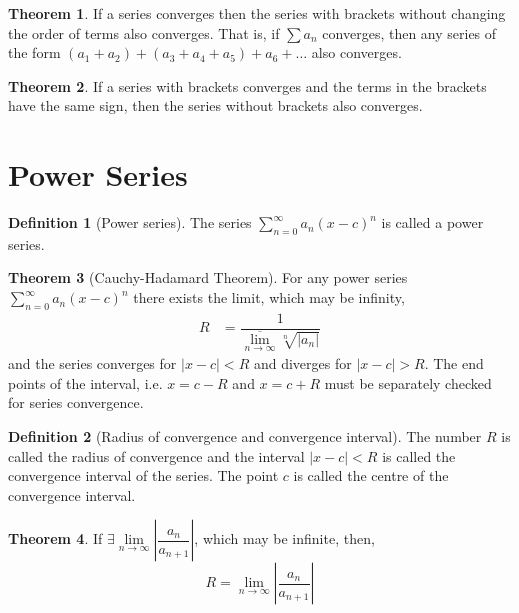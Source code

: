 \documentclass[fleqn, a4paper, 12pt, twoside]{article}
\theoremstyle{definition}
\newtheorem{definition}{Definition}
\theoremstyle{theorem}
\newtheorem{theorem}{Theorem}
\begin{document}
{\begin{theorem}
	If a series converges then the series with brackets without changing the order of terms also converges.
	That is, if $\sum a_n$ converges, then any series of the form $(a_1 + a_2) + (a_3 + a_4 + a_5) + a_6 + \dots$ also converges.
\end{theorem}

\begin{theorem}
	If a series with brackets converges and the terms in the brackets have the same sign, then the series without brackets also converges.
\end{theorem}

\section{Power Series}

\begin{definition}[Power series]
	The series $\sum\limits_{n = 0}^{\infty} a_n (x - c)^n$ is called a power series.
\end{definition}

\begin{theorem}[Cauchy-Hadamard Theorem]
	For any power series $\sum\limits_{n = 0}^{\infty} a_n (x - c)^n$ there exists the limit, which may be infinity,
	\begin{align*}
		R &= \dfrac{1}{\overline{\lim\limits_{n \to \infty}} \sqrt[n]{|a_n|}}
	\end{align*}
	and the series converges for $|x - c| < R$ and diverges for $|x - c| > R$.
	The end points of the interval, i.e. $x = c - R$ and $x = c + R$ must be separately checked for series convergence.
\end{theorem}

\begin{definition}[Radius of convergence and convergence interval]
	The number $R$ is called the radius of convergence and the interval $|x - c| < R$ is called the convergence interval of the series.
	The point $c$ is called the centre of the convergence interval.
\end{definition}

\begin{theorem}
	If $\exists \lim\limits_{n \to \infty} \left| \dfrac{a_n}{a_{n + 1}} \right|$, which may be infinite, then,
	\begin{equation*}
		R = \lim\limits_{n \to \infty} \left| \dfrac{a_n}{a_{n + 1}} \right|
	\end{equation*}
\end{theorem}

}
\end{document}
